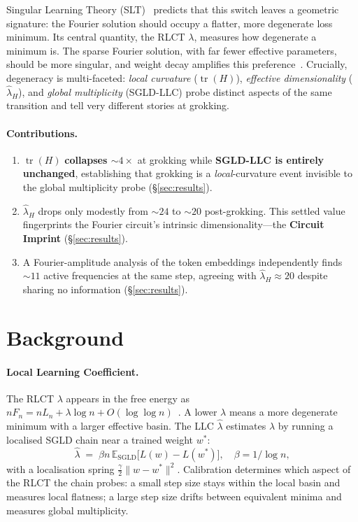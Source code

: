 \documentclass{article}
\begin{document}
Singular Learning Theory (SLT)~\citep{watanabe2009algebraic} predicts that
this switch leaves a geometric signature: the Fourier solution should occupy
a flatter, more degenerate loss minimum.  Its central quantity, the RLCT
$\lambda$, measures how degenerate a minimum is.  The sparse Fourier
solution, with far fewer effective parameters, should be more singular, and
weight decay amplifies this preference~\citep{varma2023explaining,hoogland2024developmental}.
Crucially, degeneracy is multi-faceted: \emph{local curvature}
($\operatorname{tr}(H)$), \emph{effective dimensionality} ($\hat\lambda_H$),
and \emph{global multiplicity} (SGLD-LLC) probe distinct aspects of the same
transition and tell very different stories at grokking.

\paragraph{Contributions.}
\begin{enumerate}
  \item $\operatorname{tr}(H)$ \textbf{collapses $\sim\!4\times$} at grokking
    while \textbf{SGLD-LLC is entirely unchanged}, establishing that grokking
    is a \emph{local}-curvature event invisible to the global multiplicity
    probe (\S\ref{sec:results}).
  \item $\hat\lambda_H$ drops only modestly from $\sim\!24$ to $\sim\!20$
    post-grokking.  This settled value fingerprints the Fourier circuit's
    intrinsic dimensionality—the \textbf{Circuit Imprint}
    (\S\ref{sec:results}).
  \item A Fourier-amplitude analysis of the token embeddings independently
    finds $\sim\!11$ active frequencies at the same step, agreeing with
    $\hat\lambda_H \approx 20$ despite sharing no information
    (\S\ref{sec:results}).
\end{enumerate}

\section{Background}
\label{sec:background}

\paragraph{Local Learning Coefficient.}
The RLCT $\lambda$ appears in the free energy as
$nF_n = nL_n + \lambda\log n + O(\log\log n)$~\citep{watanabe2013widely}.
A lower $\lambda$ means a more degenerate minimum with a larger effective
basin.  The LLC $\hat\lambda$ estimates $\lambda$ by running a localised
SGLD chain near a trained weight $w^*$:
\begin{equation}
  \hat\lambda \;=\; \beta n\,\mathbb{E}_{\mathrm{SGLD}}\!\bigl[L(w)-L(w^*)\bigr],
  \quad \beta = 1/\!\log n,
  \label{eq:llc}
\end{equation}
with a localisation spring $\tfrac{\gamma}{2}\|w-w^*\|^2$.
Calibration determines which aspect of the RLCT the chain probes: a small
step size stays within the local basin and measures local flatness; a large
step size drifts between equivalent minima and measures global multiplicity.
\end{document}
